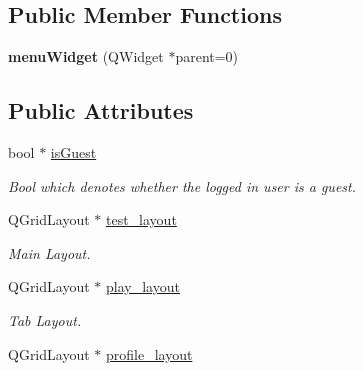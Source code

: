 \subsection*{Public Member Functions}
\begin{DoxyCompactItemize}
\item 
\hypertarget{classmenuWidget_a3d62ed65b13d97e91045aedb07f46d35}{{\bfseries menu\-Widget} (Q\-Widget $\ast$parent=0)}\label{classmenuWidget_a3d62ed65b13d97e91045aedb07f46d35}

\end{DoxyCompactItemize}
\subsection*{Public Attributes}
\begin{DoxyCompactItemize}
\item 
\hypertarget{classmenuWidget_a405e6c313a842c2b534c3a959ce7ed50}{bool $\ast$ \hyperlink{classmenuWidget_a405e6c313a842c2b534c3a959ce7ed50}{is\-Guest}}\label{classmenuWidget_a405e6c313a842c2b534c3a959ce7ed50}

\begin{DoxyCompactList}\small\item\em Bool which denotes whether the logged in user is a guest. \end{DoxyCompactList}\item 
\hypertarget{classmenuWidget_aab2576da6817e5f0d4552435a928011a}{Q\-Grid\-Layout $\ast$ \hyperlink{classmenuWidget_aab2576da6817e5f0d4552435a928011a}{test\-\_\-layout}}\label{classmenuWidget_aab2576da6817e5f0d4552435a928011a}

\begin{DoxyCompactList}\small\item\em Main Layout. \end{DoxyCompactList}\item 
\hypertarget{classmenuWidget_a02d6568d412de3ee28c642f0159db078}{Q\-Grid\-Layout $\ast$ \hyperlink{classmenuWidget_a02d6568d412de3ee28c642f0159db078}{play\-\_\-layout}}\label{classmenuWidget_a02d6568d412de3ee28c642f0159db078}

\begin{DoxyCompactList}\small\item\em Tab Layout. \end{DoxyCompactList}\item 
\hypertarget{classmenuWidget_ad8574c2d0d9b710f7b7c956ef9a860db}{Q\-Grid\-Layout $\ast$ \hyperlink{classmenuWidget_ad8574c2d0d9b710f7b7c956ef9a860db}{profile\-\_\-layout}}\label{classmenuWidget_ad8574c2d0d9b710f7b7c956ef9a860db}


\end{DoxyCompactItemize}
